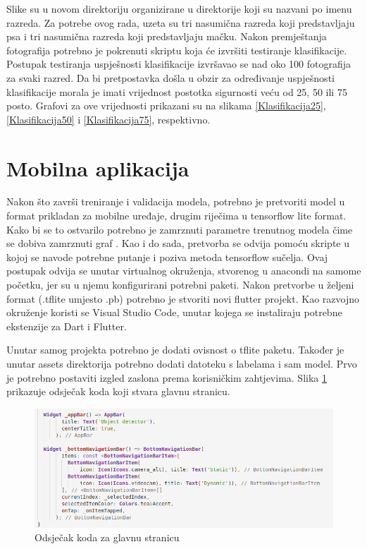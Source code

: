 Slike su u novom direktoriju organizirane u direktorije koji su nazvani po imenu razreda. 
Za potrebe ovog rada, uzeta su tri nasumična razreda koji predstavljaju psa i tri nasumična razreda koji predstavljaju mačku. Nakon premještanja fotografija potrebno je pokrenuti skriptu koja će izvršiti testiranje
klasifikacije. Postupak testiranja uspješnosti klasifikacije izvršavao se nad oko 100 fotografija za svaki razred. Da bi pretpostavka došla u obzir za određivanje uspješnosti klasifikacije morala je imati 
vrijednost postotka sigurnosti veću od 25, 50 ili 75 posto. Grafovi za ove vrijednosti prikazani su na slikama \ref{Klasifikacija25}, \ref{Klasifikacija50} i \ref{Klasifikacija75}, respektivno.

\section{Mobilna aplikacija}
Nakon što završi treniranje i validacija modela, potrebno je pretvoriti model u format prikladan za mobilne uređaje, drugim riječima u tensorflow lite format. \newline Kako bi se to ostvarilo potrebno je 
zamrznuti parametre trenutnog modela čime se dobiva zamrznuti graf . Kao i do sada, pretvorba se odvija pomoću skripte u kojoj se navode potrebne putanje i poziva 
metoda tensorflow sučelja. Ovaj postupak odvija se unutar virtualnog okruženja, stvorenog u anacondi na samome početku, jer su u njemu konfigurirani potrebni paketi. Nakon pretvorbe u željeni format (.tflite umjesto .pb) potrebno 
je stvoriti novi flutter projekt. Kao razvojno okruženje koristi se Visual Studio Code, unutar kojega se instaliraju potrebne ekstenzije za Dart i Flutter. 

Unutar samog projekta potrebno je dodati ovisnost  o tflite paketu. Također je unutar assets direktorija potrebno dodati datoteku s labelama i sam model. 
Prvo je potrebno postaviti izgled zaslona prema korisničkim zahtjevima. Slika \ref{Flutter-main} prikazuje odsječak koda koji stvara glavnu stranicu.


\begin{figure}[htb]
    \centering
    \includegraphics[width=14cm]{img/flutter-main.png}
    \caption{Odsječak koda za glavnu stranicu}
    \label{Flutter-main}
\end{figure}

